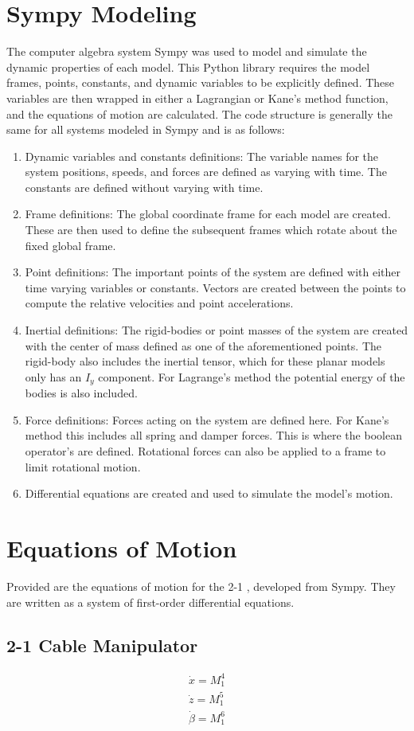 \chapter{Sympy Modeling}
\label{app:code}
The computer algebra system Sympy was used to model and simulate the dynamic properties of each model. This Python library requires the model frames, points, constants, and dynamic variables to be explicitly defined. These variables are then wrapped in either a Lagrangian or Kane's method function, and the equations of motion are calculated. The code structure is generally the same for all systems modeled in Sympy and is as follows:
\begin{enumerate}
\item Dynamic variables and constants definitions: The variable names for the system positions, speeds, and forces are defined as varying with time. The constants are defined without varying with time.
\item Frame definitions: The global coordinate frame for each model are created. These are then used to define the subsequent frames which rotate about the fixed global frame.
\item Point definitions: The important points of the system are defined with either time varying variables or constants. Vectors are created between the points to compute the relative velocities and point accelerations.
\item Inertial definitions: The rigid-bodies or point masses of the system are created with the center of mass defined as one of the aforementioned points. The rigid-body also includes the inertial tensor, which for these planar models only has an $I_y$ component. For Lagrange's method the potential energy of the bodies is also included.
\item Force definitions: Forces acting on the system are defined here. For Kane's method this includes all spring and damper forces. This is where the boolean operator's are defined. Rotational forces can also be applied to a frame to limit rotational motion.
\item Differential equations are created and used to simulate the model's motion. 
\end{enumerate}

\chapter{Equations of Motion}
\label{app:equations}
Provided are the equations of motion for the 2-1 \cspm{}, developed from Sympy. They are written as a system of first-order differential equations.
\section{2-1 Cable Manipulator}
\label{app:eom_2-1}
\begin{equation}
\label{eq:testing}
\begin{aligned}
\dot{x}=M_1^4 \\
\dot{z} =M_1^5\\ 
\dot{\beta}=M_1^6
\end{aligned}
\end{equation}

